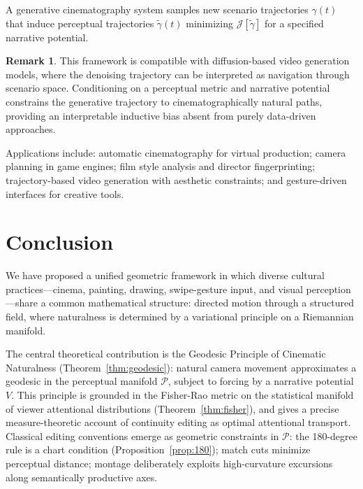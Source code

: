 \documentclass[12pt,a4paper]{article}
\theoremstyle{plain}
\theoremstyle{definition}
\newtheorem{remark}[theorem]{Remark}
\begin{document}
A generative cinematography system samples new scenario trajectories $\gamma(t)$
that induce perceptual trajectories $\tilde\gamma(t)$ minimizing
$\mathcal{J}[\tilde\gamma]$ for a specified narrative potential.

\begin{remark}
This framework is compatible with diffusion-based video generation models, where
the denoising trajectory can be interpreted as navigation through scenario space.
Conditioning on a perceptual metric and narrative potential constrains the
generative trajectory to cinematographically natural paths, providing an
interpretable inductive bias absent from purely data-driven approaches.
\end{remark}

Applications include: automatic cinematography for virtual production;
camera planning in game engines; film style analysis and director
fingerprinting; trajectory-based video generation with aesthetic constraints;
and gesture-driven interfaces for creative tools.

\section{Conclusion}
\label{sec:conclusion}

We have proposed a unified geometric framework in which diverse cultural
practices---cinema, painting, drawing, swipe-gesture input, and visual
perception---share a common mathematical structure: directed motion through a
structured field, where naturalness is determined by a variational principle on
a Riemannian manifold.

The central theoretical contribution is the Geodesic Principle of Cinematic
Naturalness (Theorem~\ref{thm:geodesic}): natural camera movement approximates a
geodesic in the perceptual manifold $\mathcal{P}$, subject to forcing by a
narrative potential $V$. This principle is grounded in the Fisher-Rao metric on
the statistical manifold of viewer attentional distributions
(Theorem~\ref{thm:fisher}), and gives a precise measure-theoretic account of
continuity editing as optimal attentional transport. Classical editing conventions
emerge as geometric constraints in $\mathcal{P}$: the 180-degree rule is a chart
condition (Proposition~\ref{prop:180}); match cuts minimize perceptual distance;
montage deliberately exploits high-curvature excursions along semantically
productive axes.
\end{document}
